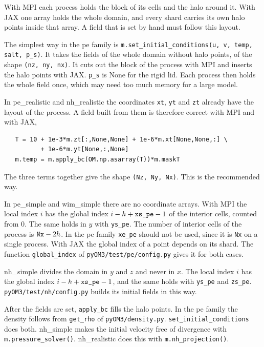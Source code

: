 \documentclass[12pt]{article}
\begin{document}
With MPI each process holds the block of its cells and the halo around it.
With JAX one array holds the whole domain, and every shard carries its own halo points inside that array.
A field that is set by hand must follow this layout.

The simplest way in the pe family is \verb|m.set_initial_conditions(u, v, temp, salt, p_s)|.
It takes the fields of the whole domain without halo points, of the shape \verb|(nz, ny, nx)|.
It cuts out the block of the process with MPI and inserts the halo points with JAX.
\verb|p_s| is None for the rigid lid.
Each process then holds the whole field once, which may need too much memory for a large model.

In pe\_realistic and nh\_realistic the coordinates \verb|xt|, \verb|yt| and \verb|zt| already have the layout of the process.
A field built from them is therefore correct with MPI and with JAX,
\begin{verbatim}
   T = 10 + 1e-3*m.zt[:,None,None] + 1e-6*m.xt[None,None,:] \
          + 1e-6*m.yt[None,:,None]
   m.temp = m.apply_bc(OM.np.asarray(T))*m.maskT
\end{verbatim}
The three terms together give the shape \verb|(Nz, Ny, Nx)|.
This is the recommended way.

In pe\_simple and wim\_simple there are no coordinate arrays.
With MPI the local index $i$ has the global index $i - h + \verb|xs_pe| - 1$ of the interior cells, counted from 0.
The same holds in $y$ with \verb|ys_pe|.
The number of interior cells of the process is $\verb|Nx| - 2h$.
In the pe family \verb|xe_pe| should not be used, since it is \verb|Nx| on a single process.
With JAX the global index of a point depends on its shard.
The function \verb|global_index| of \verb|pyOM3/test/pe/config.py| gives it for both cases.

nh\_simple divides the domain in $y$ and $z$ and never in $x$.
The local index $i$ has the global index $i - h + \verb|xs_pe| - 1$, and the same holds with \verb|ys_pe| and \verb|zs_pe|.
\verb|pyOM3/test/nh/config.py| builds its initial fields in this way.

After the fields are set, \verb|apply_bc| fills the halo points.
In the pe family the density follows from \verb|get_rho| of \verb|pyOM3/density.py|.
\verb|set_initial_conditions| does both.
nh\_simple makes the initial velocity free of divergence with \verb|m.pressure_solver()|.
nh\_realistic does this with \verb|m.nh_projection()|.

\clearpage{}\label{doc:pe_simple}

\clearpage{}\label{doc:pe_realistic}

\clearpage{}\label{doc:nh_simple}

\clearpage{}\label{doc:nh_realistic}

\clearpage{}\label{doc:wim_simple}

\clearpage{}\label{doc:wim_realistic}

\clearpage{}\label{doc:wim_snl_exact}

\end{document}

